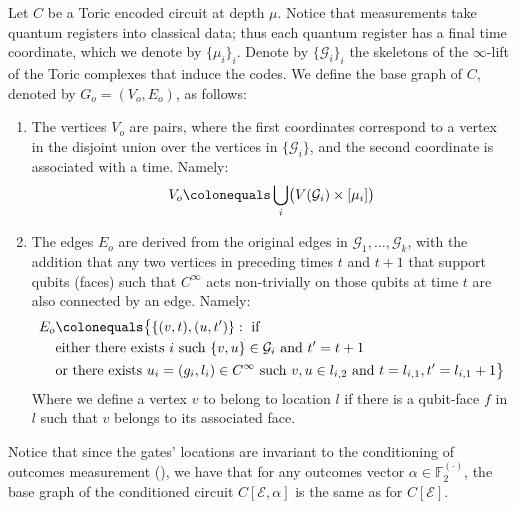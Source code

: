  \begin{definition}
    Let $C$ be a Toric encoded circuit at depth $\mu$. Notice that measurements take quantum registers into classical data; thus each quantum register has a final time coordinate, which we denote by $\{\mu_i\}_i$. Denote by $\{\mathcal{G}_{i}\}_i$ the skeletons of the $\infty$-lift of the Toric complexes that induce the codes. We define the base graph of $C$, denoted by $G_{o} = (V_{o}, E_{o})$, as follows:
    \begin{enumerate}
      \item The vertices $V_{o}$ are pairs, where the first coordinates correspond to a vertex in the disjoint union over the vertices in $\{\mathcal{G}_{i}\}$, and the second coordinate is associated with a time. Namely:
        \begin{equation*}
          \begin{split}
            V_{o} \colonequals \bigcup_{i} \bigl( V(\mathcal{G}_{i}) \times [\mu_{i}] \bigr)
          \end{split}
        \end{equation*}
      \item The edges $E_{o}$ are derived from the original edges in $\mathcal{G}_{1}, \ldots, \mathcal{G}_{k}$, with the addition that any two vertices in preceding times $t$ and $t+1$ that support qubits (faces) such that $C^{\infty}$ acts non-trivially on those qubits at time $t$ are also connected by an edge. Namely:
        \begin{equation*}
          \begin{split}
            E_{o} & \colonequals \big\{ \{(v,t), (u,t^{\prime}) \} :  \text{ if }     \\ 
              & \text{either there exists } i \text{ such }  \{v,u\} \in \mathcal{G}_{i} \text{ and } t^{\prime} = t+1 \\
            & \text{or there exists } u_i = (g_{i},l_{i}) \in C^{\infty} \text{ such }  v,u \in l_{i,2} \text{ and } t = l_{i,1}, t^{\prime} = l_{i,1}+1  \big\} 
          \end{split}
        \end{equation*}
Where we define a vertex $v$ to belong to location $l$ if there is a qubit-face $f$ in $l$ such that $v$ belongs to its associated face.
    \end{enumerate} 
  \end{definition}
Notice that since the gates' locations are invariant to the conditioning of outcomes measurement (), we have that for any outcomes vector $\alpha \in \mathbb{F}_{2}^{(\cdot)}$, the base graph of the conditioned circuit $C[\mathcal{E},\alpha]$ is the same as for $C[\mathcal{E}]$.

